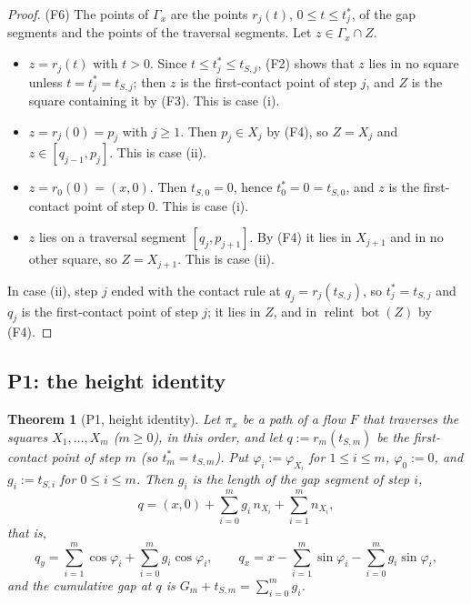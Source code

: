 \documentclass[11pt]{amsart}
\newcommand{\relint}{\operatorname{relint}}
\newcommand{\Bot}{\operatorname{bot}}
\newtheorem{theorem}{Theorem}[section]
\theoremstyle{definition}
\theoremstyle{remark}
\numberwithin{equation}{section}
\begin{document}
\begin{proof}
(F6) The points of $\Gamma_x$ are the points $r_j(t)$, $0\le t\le t^*_j$, of the gap segments and the points of the traversal segments. Let $z\in\Gamma_x\cap Z$.
\begin{itemize}
\item $z=r_j(t)$ with $t>0$. Since $t\le t^*_j\le t_{S,j}$, (F2) shows that $z$ lies in no square unless $t=t^*_j=t_{S,j}$; then $z$ is the first-contact point of step $j$, and $Z$ is the square containing it by (F3). This is case (i).
\item $z=r_j(0)=p_j$ with $j\ge1$. Then $p_j\in X_j$ by (F4), so $Z=X_j$ and $z\in[q_{j-1},p_j]$. This is case (ii).
\item $z=r_0(0)=(x,0)$. Then $t_{S,0}=0$, hence $t^*_0=0=t_{S,0}$, and $z$ is the first-contact point of step $0$. This is case (i).
\item $z$ lies on a traversal segment $[q_j,p_{j+1}]$. By (F4) it lies in $X_{j+1}$ and in no other square, so $Z=X_{j+1}$. This is case (ii).
\end{itemize}
In case (ii), step $j$ ended with the contact rule at $q_j=r_j(t_{S,j})$, so $t^*_j=t_{S,j}$ and $q_j$ is the first-contact point of step $j$; it lies in $Z$, and in $\relint\Bot(Z)$ by (F4).
\end{proof}

\subsection{P1: the height identity}\label{ssec:P12-P1}

\begin{theorem}[P1, height identity]\label{thm:P1}
Let $\pi_x$ be a path of a flow $F$ that traverses the squares $X_1,\dots,X_m$ \textup{(}$m\ge0$\textup{)}, in this order, and let $q:=r_m(t_{S,m})$ be the first-contact point of step $m$ \textup{(}so $t^*_m=t_{S,m}$\textup{)}. Put $\varphi_i:=\varphi_{X_i}$ for $1\le i\le m$, $\varphi_0:=0$, and $g_i:=t_{S,i}$ for $0\le i\le m$. Then $g_i$ is the length of the gap segment of step $i$,
\begin{equation}\label{eq:P12-P1}
q=(x,0)+\sum_{i=0}^mg_i\,n_{X_i}+\sum_{i=1}^mn_{X_i},
\end{equation}
that is,
\begin{equation}\label{eq:P12-P1y}
q_y=\sum_{i=1}^m\cos\varphi_i+\sum_{i=0}^mg_i\cos\varphi_i,\qquad
q_x=x-\sum_{i=1}^m\sin\varphi_i-\sum_{i=0}^mg_i\sin\varphi_i,
\end{equation}
and the cumulative gap at $q$ is $G_m+t_{S,m}=\sum_{i=0}^mg_i$.
\end{theorem}
\end{document}
